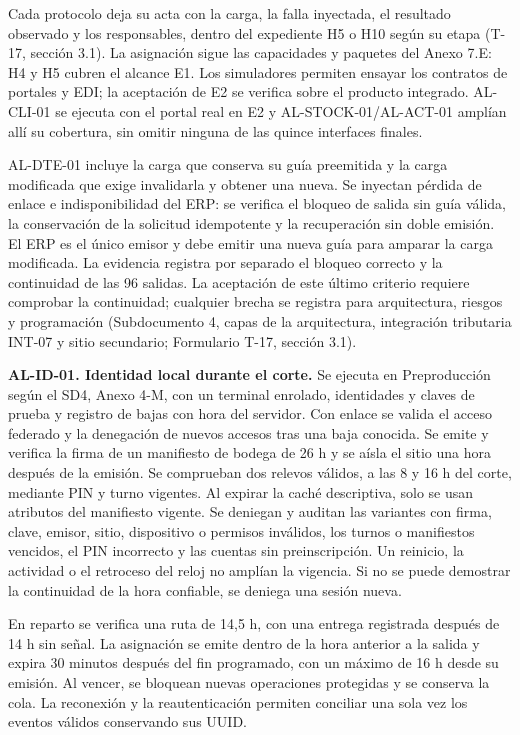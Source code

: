 Cada protocolo deja su acta con la carga, la falla inyectada, el resultado observado y los responsables, dentro del expediente H5 o H10 según su etapa (T-17, sección 3.1). La asignación sigue las capacidades y paquetes del Anexo 7.E: H4 y H5 cubren el alcance E1. Los simuladores permiten ensayar los contratos de portales y EDI; la aceptación de E2 se verifica sobre el producto integrado. AL-CLI-01 se ejecuta con el portal real en E2 y AL-STOCK-01/AL-ACT-01 amplían allí su cobertura, sin omitir ninguna de las quince interfaces finales.

AL-DTE-01 incluye la carga que conserva su guía preemitida y la carga modificada que exige invalidarla y obtener una nueva. Se inyectan pérdida de enlace e indisponibilidad del ERP: se verifica el bloqueo de salida sin guía válida, la conservación de la solicitud idempotente y la recuperación sin doble emisión. El ERP es el único emisor y debe emitir una nueva guía para amparar la carga modificada. La evidencia registra por separado el bloqueo correcto y la continuidad de las 96 salidas. La aceptación de este último criterio requiere comprobar la continuidad; cualquier brecha se registra para arquitectura, riesgos y programación (Subdocumento 4, capas de la arquitectura, integración tributaria INT-07 y sitio secundario; Formulario T-17, sección 3.1).

\textbf{AL-ID-01. Identidad local durante el corte.} Se ejecuta en Preproducción según el SD4, Anexo 4-M, con un terminal enrolado, identidades y claves de prueba y registro de bajas con hora del servidor. Con enlace se valida el acceso federado y la denegación de nuevos accesos tras una baja conocida. Se emite y verifica la firma de un manifiesto de bodega de 26 h y se aísla el sitio una hora después de la emisión. Se comprueban dos relevos válidos, a las 8 y 16 h del corte, mediante PIN y turno vigentes. Al expirar la caché descriptiva, solo se usan atributos del manifiesto vigente. Se deniegan y auditan las variantes con firma, clave, emisor, sitio, dispositivo o permisos inválidos, los turnos o manifiestos vencidos, el PIN incorrecto y las cuentas sin preinscripción. Un reinicio, la actividad o el retroceso del reloj no amplían la vigencia. Si no se puede demostrar la continuidad de la hora confiable, se deniega una sesión nueva.

En reparto se verifica una ruta de 14,5 h, con una entrega registrada después de 14 h sin señal. La asignación se emite dentro de la hora anterior a la salida y expira 30 minutos después del fin programado, con un máximo de 16 h desde su emisión. Al vencer, se bloquean nuevas operaciones protegidas y se conserva la cola. La reconexión y la reautenticación permiten conciliar una sola vez los eventos válidos conservando sus UUID.

